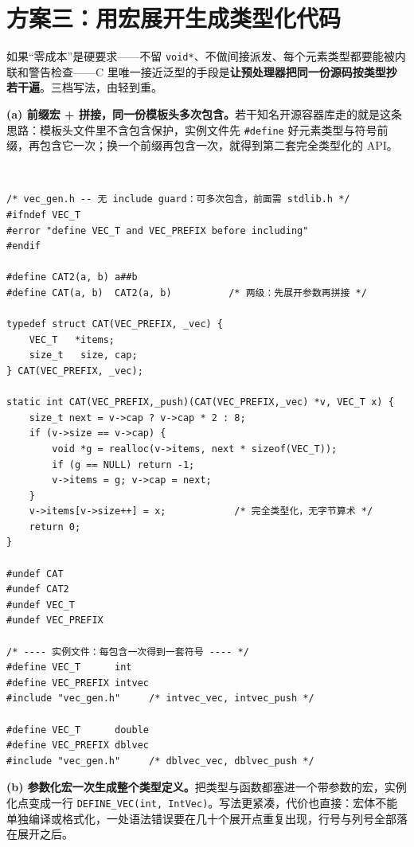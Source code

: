 \documentclass[12pt,a4paper,fontset=fandol]{ctexbook}
\newcommand{\clabel}{%
  \tcbox[on line,colback=cheadbg,colframe=cheadbg,
    boxrule=0pt,arc=1pt,left=2pt,right=2pt,top=1pt,bottom=1pt,
    colupper=white,fontupper=\scriptsize\bfseries]{C}}
\newcommand{\kw}[1]{\texttt{#1}}
\begin{document}
\section{方案三：用宏展开生成类型化代码}

如果“零成本”是硬要求——不留 \kw{void*}、不做间接派发、每个元素类型都要能被内联和警告检查——C 里唯一接近泛型的手段是\textbf{让预处理器把同一份源码按类型抄若干遍}。三档写法，由轻到重。

\textbf{(a) 前缀宏 + 拼接，同一份模板头多次包含。}若干知名开源容器库走的就是这条思路：模板头文件里不含包含保护，实例文件先 \kw{\#define} 好元素类型与符号前缀，再包含它一次；换一个前缀再包含一次，就得到第二套完全类型化的 API。

\clabel\ \begin{lstlisting}[style=cstyle,caption={前缀宏 + \#\# 拼接：一份模板头生成两套具体类型}]
/* vec_gen.h -- 无 include guard：可多次包含，前面需 stdlib.h */
#ifndef VEC_T
#error "define VEC_T and VEC_PREFIX before including"
#endif

#define CAT2(a, b) a##b
#define CAT(a, b)  CAT2(a, b)          /* 两级：先展开参数再拼接 */

typedef struct CAT(VEC_PREFIX, _vec) {
    VEC_T   *items;
    size_t   size, cap;
} CAT(VEC_PREFIX, _vec);

static int CAT(VEC_PREFIX,_push)(CAT(VEC_PREFIX,_vec) *v, VEC_T x) {
    size_t next = v->cap ? v->cap * 2 : 8;
    if (v->size == v->cap) {
        void *g = realloc(v->items, next * sizeof(VEC_T));
        if (g == NULL) return -1;
        v->items = g; v->cap = next;
    }
    v->items[v->size++] = x;            /* 完全类型化，无字节算术 */
    return 0;
}

#undef CAT
#undef CAT2
#undef VEC_T
#undef VEC_PREFIX

/* ---- 实例文件：每包含一次得到一套符号 ---- */
#define VEC_T      int
#define VEC_PREFIX intvec
#include "vec_gen.h"     /* intvec_vec, intvec_push */

#define VEC_T      double
#define VEC_PREFIX dblvec
#include "vec_gen.h"     /* dblvec_vec, dblvec_push */
\end{lstlisting}

\textbf{(b) 参数化宏一次生成整个类型定义。}把类型与函数都塞进一个带参数的宏，实例化点变成一行 \kw{DEFINE\_VEC(int, IntVec)}。写法更紧凑，代价也直接：宏体不能单独编译或格式化，一处语法错误要在几十个展开点重复出现，行号与列号全部落在展开之后。
\end{document}
